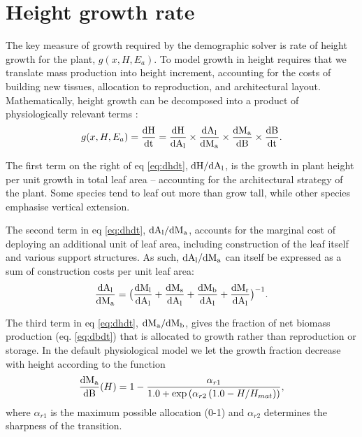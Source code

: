 \documentclass[10pt,twoside]{article}
\begin{document}
\section{Height growth rate}\label{height-growth-rate}

The key measure of growth required by the demographic solver is
rate of height growth for the plant, $g(x, H, E_a)$. To model growth in
height requires that we translate mass
production into height increment, accounting for the costs of
building new tissues, allocation
to reproduction, and architectural layout. Mathematically, height growth
can be decomposed into a product of physiologically relevant terms
\citep{Falster-2011}:
\begin{equation} \label{eq:dhdt}
g(x, H, E_a) = \frac{\rm{d}H}{\rm{d}t} = \frac{\rm{d}H}{\rm{d}A_\textrm{l}}
\times \frac{\rm{d}A_\textrm{l}}{\rm{d}M_\textrm{a}}
\times \frac{\rm{d}M_\textrm{a}}{\rm{d}B}
\times \frac{\rm{d}B}{\rm{d}t}.
\end{equation}

The first term on the right of eq \ref{eq:dhdt},
\(\rm{d}H / \rm{d}A_\textrm{l}\), is the growth in plant height
per unit growth in total leaf area -- accounting for the architectural
strategy of the plant. Some species tend to leaf out more than grow
tall, while other species emphasise vertical extension.

The second term in eq \ref{eq:dhdt},
\(\rm{d}A_\textrm{l} / \rm{d}M_\textrm{a}\), accounts for the
marginal cost of deploying an additional unit of leaf area, including
construction of the leaf itself and various support structures. As such,
\(\rm{d}A_\textrm{l} / \rm{d}M_\textrm{a}\) can itself be
expressed as a sum of construction costs per unit leaf area:
\begin{equation}\label{eq:daldmt}
\frac{\rm{d}A_\textrm{l}}{\rm{d}M_\textrm{a}}
= \big( \frac{\rm{d}M_\textrm{l}}{\rm{d}A_\textrm{l}} + \frac{\rm{d}M_\textrm{s}}{\rm{d}A_\textrm{l}} + \frac{\rm{d}M_\textrm{b}}{\rm{d}A_\textrm{l}} + \frac{\rm{d}M_\textrm{r}}{\rm{d}A_\textrm{l}}\big)^{-1}.
\end{equation}

The third term in eq \ref{eq:dhdt},
\(\rm{d}M_\textrm{a} / \rm{d}M_\textrm{b}\), gives the fraction
of net biomass production (eq. \ref{eq:dbdt}) that is allocated to
growth rather than reproduction or storage. In the default physiological model
we let the growth fraction decrease with height according to the function
\begin{equation}\label{eq:allocation}
\frac{\rm{d}M_\textrm{a}}{\rm{d}B}(H) = 1 -
 \frac{\alpha_{r1}} {1.0 + \exp\left(\alpha_{r2}  \left(1.0 - H / H_{mat}\right)\right)},
\end{equation}
where $\alpha_{r1}$ is the maximum possible allocation (0-1) and $\alpha_{r2}$
determines the sharpness of the transition.
\end{document}
